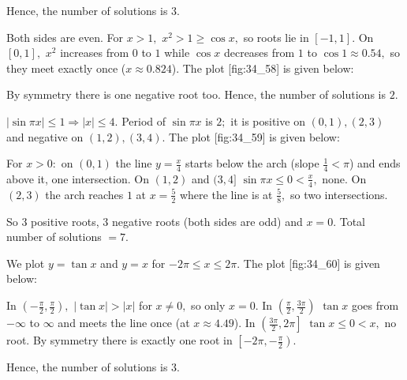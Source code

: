  Hence, the number of solutions is $3.$

\item Both sides are even. For $x > 1,$ $x^2 > 1\geq\cos x,$ so roots lie in $[-1, 1].$ On $[0, 1],$ $x^2$ increases
  from $0$ to $1$ while $\cos x$ decreases from $1$ to $\cos1\approx 0.54,$ so they meet exactly once ($x\approx
  0.824$). The plot [fig:34_58] is given below:

  \startplacefigure[title={Plot of $x^2$ and $\cos x$}, reference=fig:34_58]
    \externalfigure[34_58.pdf]
  \stopplacefigure

  By symmetry there is one negative root too. Hence, the number of solutions is $2.$

\item $|\sin\pi x|\leq 1 \Rightarrow |x|\leq 4.$ Period of $\sin\pi x$ is $2;$ it is positive on $(0, 1), (2, 3)$ and
  negative on $(1, 2), (3, 4).$ The plot [fig:34_59] is given below:

  \startplacefigure[title={Plot of $\sin\pi x$ and $\frac{x}{4}$}, reference=fig:34_59]
    \externalfigure[34_59.pdf]
  \stopplacefigure

  For $x > 0:$ on $(0, 1)$ the line $y = \frac{x}{4}$ starts below the arch (slope $\frac{1}{4} < \pi$) and ends above
  it, one intersection. On $(1, 2)$ and $(3, 4]$ $\sin\pi x\leq 0 < \frac{x}{4},$ none. On $(2, 3)$ the arch reaches $1$
  at $x = \frac{5}{2}$ where the line is at $\frac{5}{8},$ so two intersections.

  So $3$ positive roots, $3$ negative roots (both sides are odd) and $x = 0.$ Total number of solutions $= 7.$

\item We plot $y = \tan x$ and $y = x$ for $-2\pi\leq x\leq 2\pi.$ The plot [fig:34_60] is given below:

  \startplacefigure[title={Plot of $\tan x$ and $x$}, reference=fig:34_60]
    \externalfigure[34_60.pdf]
  \stopplacefigure

  In $\left(-\frac{\pi}{2}, \frac{\pi}{2}\right),$ $|\tan x| > |x|$ for $x\neq 0,$ so only $x = 0.$ In
  $\left(\frac{\pi}{2}, \frac{3\pi}{2}\right)$ $\tan x$ goes from $-\infty$ to $\infty$ and meets the line once (at
  $x\approx 4.49$). In $\left(\frac{3\pi}{2}, 2\pi\right]$ $\tan x\leq 0 < x,$ no root. By symmetry there is exactly one
  root in $\left[-2\pi, -\frac{\pi}{2}\right).$

  Hence, the number of solutions is $3.$

